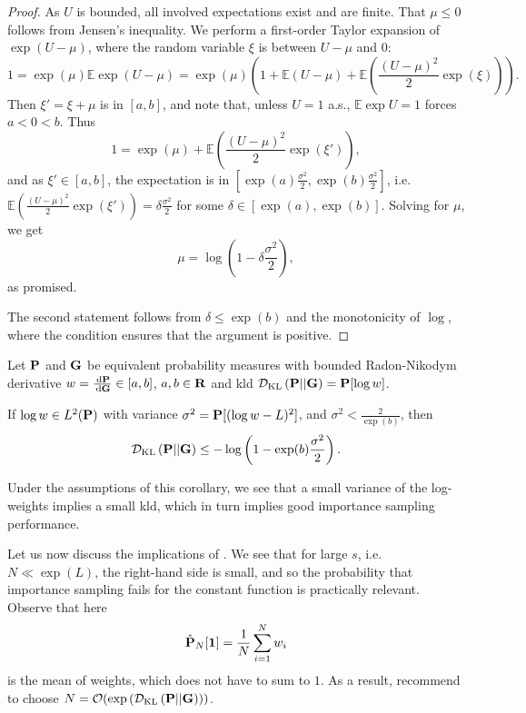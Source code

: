 \begin{proof}
    As $U$ is bounded, all involved expectations exist and are finite. That $\mu \leq 0$ follows from Jensen's inequality. We perform a first-order Taylor expansion of $\exp(U - \mu)$, where the random variable $\xi$ is between $U - \mu$ and $0$:
    $$
    1 = \exp(\mu)\mathbb E \exp (U - \mu) = \exp (\mu) \left( 1 + \mathbb E (U - \mu) + \mathbb E\left(\frac{(U-\mu)^{2}}{2} \exp(\xi)\right) \right).
    $$
    Then $\xi' = \xi + \mu$ is in $[a,b]$, and note that, unless $U = 1$ a.s., $\mathbb E \exp U = 1$ forces $a < 0 < b$. 
    Thus
    $$
    1 = \exp(\mu) + \mathbb E\left(\frac{(U-\mu)^{2}}{2} \exp(\xi')\right),
    $$
    and as $\xi' \in [a,b]$, the expectation is in $\left[\exp(a) \frac{\sigma^{2}}{2}, \exp(b) \frac{\sigma^{2}}{2}\right]$, i.e. $\mathbb E\left(\frac{(U-\mu)^{2}}{2} \exp(\xi')\right) = \delta \frac{\sigma^{2}}{2}$ for some $\delta \in [\exp(a),\exp(b)]$. Solving for $\mu$, we get 
    $$
    \mu = \log \left( 1 - \delta \frac{\sigma^{2}}{2} \right),
    $$
    as promised.

    The second statement follows from $\delta \leq \exp(b)$ and the monotonicity of $\log$, where the condition ensures that the argument is positive.
\end{proof}

\begin{corollary}
    \label{cor:dkl_bounded}
    Let $\P$ and $\G$ be equivalent probability measures with bounded Radon-Nikodym derivative $w = \frac{\d\P}{\d\G} \in [a,b]$, $a, b \in \R$ and \acrshort{kld} $\Dkl{\P}{\G} =\P [\log w]$.
    
    If $\log w \in L^{2}(\P)$ with variance $\sigma^{2} = \P [(\log w - L)^2]$, and $\sigma^{2} < \frac{2}{\exp(b)}$, then 
    $$
    \Dkl{\P}{\G} \leq - \log \left(1 - \exp(b) \frac{\sigma^{2}}{2} \right).
    $$
\end{corollary}
Under the assumptions of this corollary, we see that a small variance of the log-weights implies a small \acrshort{kld}, which in turn implies good importance sampling performance.

Let us now discuss the implications of . We see that for large $s$, i.e. $N \ll \exp(L)$, the right-hand side is small, and so the probability that importance sampling fails for the constant function is practically relevant. Observe that here 
$$
\hat \P_{N} [\mathbf 1 ] = \frac{1}{N} \sum_{i = 1}^N w_{i}
$$
is the mean of weights, which does not have to sum to $1$. 
As a result, \citeauthor{Chatterjee2018Sample} recommend to choose $N = \mathcal O( \exp \left( \Dkl{\P}{\G} \right))$. 


